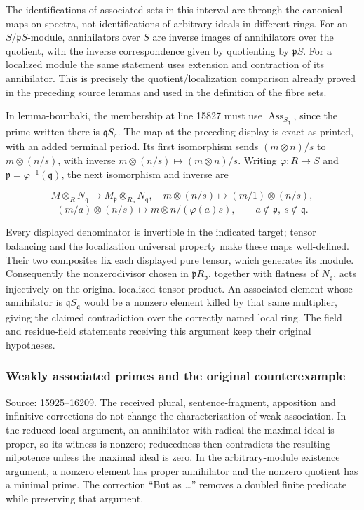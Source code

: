 The identifications of associated sets in this interval are through the canonical maps on spectra, not identifications of arbitrary ideals in different rings. For an \(S/\mathfrak pS\)-module, annihilators over \(S\) are inverse images of annihilators over the quotient, with the inverse correspondence given by quotienting by \(\mathfrak pS\). For a localized module the same statement uses extension and contraction of its annihilator. This is precisely the quotient/localization comparison already proved in the preceding source lemmas and used in the definition of the fibre sets.

In lemma-\AlgebraIdentifierBreak{}bourbaki, the membership at line 15827 must use \(\operatorname{Ass}_{S_{\mathfrak q}}\), since the prime written there is \(\mathfrak qS_{\mathfrak q}\). The map at the preceding display is exact as printed, with an added terminal period. Its first isomorphism sends \((m\otimes n)/s\) to \(m\otimes(n/s)\), with inverse \(m\otimes(n/s)\mapsto(m\otimes n)/s\). Writing \(\varphi:R\to S\) and \(\mathfrak p=\varphi^{-1}(\mathfrak q)\), the next isomorphism and inverse are

\[
M\otimes_RN_{\mathfrak q}\longrightarrow
 M_{\mathfrak p}\otimes_{R_{\mathfrak p}}N_{\mathfrak q},
\quad m\otimes(n/s)\longmapsto(m/1)\otimes(n/s),
\] \[
(m/a)\otimes(n/s)\longmapsto m\otimes n/(\varphi(a)s),
\qquad a\notin\mathfrak p,\ s\notin\mathfrak q.
\]

Every displayed denominator is invertible in the indicated target; tensor balancing and the localization universal property make these maps well-defined. Their two composites fix each displayed pure tensor, which generates its module. Consequently the nonzerodivisor chosen in \(\mathfrak pR_{\mathfrak p}\), together with flatness of \(N_{\mathfrak q}\), acts injectively on the original localized tensor product. An associated element whose annihilator is \(\mathfrak qS_{\mathfrak q}\) would be a nonzero element killed by that same multiplier, giving the claimed contradiction over the correctly named local ring. The field and residue-field statements receiving this argument keep their original hypotheses.

\subsubsection{Weakly associated primes and the original counterexample}\label{algebra-proof-005-weakly-associated-primes-and-the-original-counterexample}

Source: 15925--16209. The received plural, sentence-fragment, apposition and infinitive corrections do not change the characterization of weak association. In the reduced local argument, an annihilator with radical the maximal ideal is proper, so its witness is nonzero; reducedness then contradicts the resulting nilpotence unless the maximal ideal is zero. In the arbitrary-module existence argument, a nonzero element has proper annihilator and the nonzero quotient has a minimal prime. The correction ``But as \ldots'' removes a doubled finite predicate while preserving that argument.

